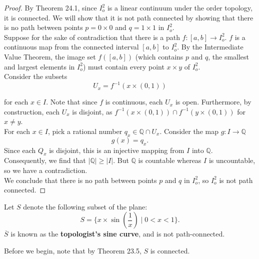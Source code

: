 \documentclass[11pt]{article}
\begin{document}
\begin{proof}
By Theorem 24.1, since $I_o^2$ is a linear continuum under the order topology, it is connected. We will show that it is not path connected by showing that there is no path between points $p = 0 \times 0$ and $q = 1 \times 1$ in $I_o^2$. \\

Suppose for the sake of contradiction that there is a path $f \colon [a, b] \rightarrow I_o^2$. $f$ is a continuous map from the connected interval $[a, b]$ to $I_o^2$. By the Intermediate Value Theorem, the image set $f([a, b])$ (which contains $p$ and $q$, the smallest and largest elements in $I_o^2$) must contain every point $x \times y$ of $I_o^2$. \\

Consider the subsets 
\[
    U_x = f^{-1}\left( x \times (0, 1) \right)
\]

for each $x \in I$. Note that since $f$ is continuous, each $U_x$ is open. Furthermore, by construction, each $U_x$ is disjoint, as $f^{-1}\left( x \times (0, 1) \right) \cap f^{-1}\left( y \times (0, 1) \right)$ for $x \neq y$. \\

For each $x \in I$, pick a rational number $q_x \in \mathbb{Q} \cap U_x$. Consider the map $g \colon I \rightarrow \mathbb{Q}$
\[
    g(x) = q_x.
\]
Since each $Q_x$ is disjoint, this is an injective mapping from $I$ into $\mathbb{Q}$. Consequently, we find that $|\mathbb{Q}| \geq |I|$. But $\mathbb{Q}$ is countable whereas $I$ is uncountable, so we have a contradiction.\\

We conclude that there is no path between points $p$ and $q$ in $I_o^2$, so $I_o^2$ is not path connected.\end{proof}

\begin{eg}
Let $S$ denote the following subset of the plane:
\[
    S = \{ x \times \sin \left( \frac{1}{x} \right) \mid 0 < x < 1\}. 
\]
$\overline{S}$ is known as the \textbf{topologist's sine curve}, and is not path-connected.
\end{eg}

Before we begin, note that by Theorem 23.5, $S$ is connected. \\
\end{document}
